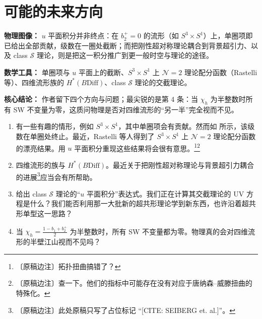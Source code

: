 \section{可能的未来方向}

\begin{keytakeaways}
\item \textbf{物理图像：} $u$ 平面积分并非终点：在 $b_{2}^{+}=0$ 的流形（如 $S^{3}\times S^{1}$）上，单圈项即已给出全部贡献，级数在一圈处截断；而把刚性超对称理论耦合到背景超引力、以及 class $\mathcal{S}$ 理论，则是把这一积分推广到更一般时空与理论的途径。
\item \textbf{数学工具：} 单圈项与 $u$ 平面上的截断、$S^{3}\times S^{1}$ 上 $\mathcal{N}=2$ 理论配分函数（Rastelli 等）、四维流形族的 $H^{*}(B\mathrm{Diff})$、class $\mathcal{S}$ 理论的交截理论。
\item \textbf{核心结论：} 作者留下四个方向与问题；最尖锐的是第 4 条：当 $\chi_{h}$ 为半整数时所有 SW 不变量为零，这质问物理是否对四维流形的“另一半”完全视而不见。
\end{keytakeaways}

\begin{enumerate}[label=\arabic*., leftmargin=2.1em]
\item 有一些有趣的情形，例如 $S^{3}\times S^{1}$，其中单圈项会有贡献。然而如 \cite{ref38} 所示，该级数在单圈处终止。最近，Rastelli 等人得到了 $S^{3}\times S^{1}$ 上 $\mathcal{N}=2$ 理论配分函数的漂亮结果。用 $u$ 平面积分重现这些结果将会很有意思。\footnote{〔原稿边注〕拓扑扭曲搞错了？}\footnote{〔原稿边注〕查一下。他们的指标中可能存在没有对应于唐纳森--威滕扭曲的特殊化。}

\item 四维流形的族与 $H^{*}(B\mathrm{Diff})$。最近关于把刚性超对称理论与背景超引力耦合的进展\footnote{〔原稿边注〕此处原稿只写了占位标记 “[CITE: SEIBERG et. al.]”。}应当会有所帮助。

\item 给出 class $\mathcal{S}$ 理论的“$u$ 平面积分”表达式。我们正在计算其交截理论的 UV 方程是什么？我们能否利用那一大批新的超共形理论学到新东西，也许沿着超共形单型这一思路？

\item 当 $\chi_{h}=\frac{1-b_{1}+b_{2}^{+}}{2}$ 为半整数时，所有 SW 不变量都为零。物理真的会对四维流形的半壁江山视而不见吗？
\end{enumerate}


